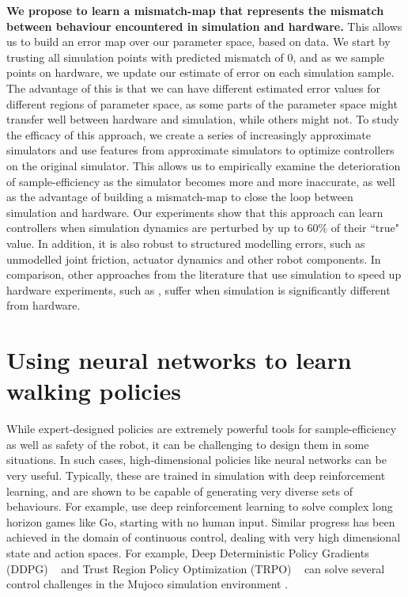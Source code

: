  \textbf{We propose to learn a mismatch-map that represents the mismatch between behaviour encountered in simulation and hardware.} This allows us to build an error map over our parameter space, based on data. We start by trusting all simulation points with predicted mismatch of 0, and as we sample points on hardware, we update our estimate of error on each simulation sample. The advantage of this is that we can have different estimated error values for different regions of parameter space, as some parts of the parameter space might transfer well between hardware and simulation, while others might not. %
To study the efficacy of this approach, we create a series of increasingly approximate simulators and use features from approximate simulators to optimize controllers on the original simulator. This allows us to empirically examine the deterioration of sample-efficiency as the simulator becomes more and more inaccurate, as well as the advantage of building a mismatch-map to close the loop between simulation and hardware. Our experiments show that this approach can learn controllers when simulation dynamics are perturbed by up to 60\% of their ``true" value. In addition, it is also robust to structured modelling errors, such as unmodelled joint friction, actuator dynamics and other robot components. In comparison, other approaches from the literature that use simulation to speed up hardware experiments, such as \cite{cully2015robots}, suffer when simulation is significantly different from hardware. 


\section{Using neural networks to learn walking policies}

While expert-designed policies are extremely powerful tools for sample-efficiency as well as safety of the robot, it can be challenging to design them in some situations. In such cases, high-dimensional policies like neural networks can be very useful. Typically, these are trained in simulation with deep reinforcement learning, and are shown to be capable of generating very diverse sets of behaviours. For example, \cite{silver2016mastering} use deep reinforcement learning to solve complex long horizon games like Go, starting with no human input. Similar progress has been achieved in the domain of continuous control, dealing with very high dimensional state and action spaces. For example, Deep Deterministic Policy Gradients (DDPG) ~\citep{lillicrap2015continuous} and Trust Region Policy Optimization  (TRPO) ~\citep{schulman2015trust} can solve several control challenges in the Mujoco simulation environment \citep{todorov2012mujoco}. 

